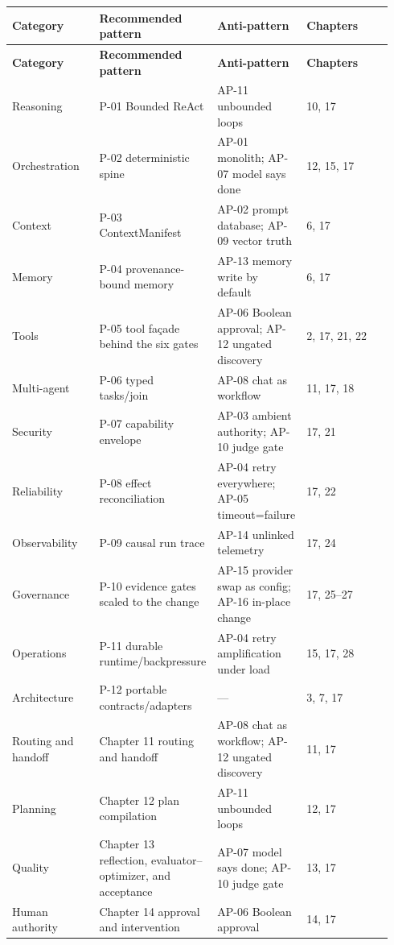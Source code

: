 \BookTableStart
\fontsize{7.2}{9}\selectfont
\begin{longtable}{@{}Y{0.2350\linewidth}Y{0.2350\linewidth}Y{0.2350\linewidth}Y{0.2350\linewidth}@{}}
\color{white}\bfseries \textbf{Category} & \color{white}\bfseries \textbf{Recommended pattern} & \color{white}\bfseries \textbf{Anti-pattern} & \color{white}\bfseries \textbf{Chapters} \\
\endfirsthead
{}
\color{white}\bfseries \textbf{Category} & \color{white}\bfseries \textbf{Recommended pattern} & \color{white}\bfseries \textbf{Anti-pattern} & \color{white}\bfseries \textbf{Chapters} \\
\endhead
Reasoning & P-01 Bounded ReAct & AP-11 unbounded loops & 10, 17 \\
Orchestration & P-02 deterministic spine & AP-01 monolith; AP-07 model says done & 12, 15, 17 \\
Context & P-03 ContextManifest & AP-02 prompt database; AP-09 vector truth & 6, 17 \\
Memory & P-04 provenance-bound memory & AP-13 memory write by default & 6, 17 \\
Tools & P-05 tool façade behind the six gates & AP-06 Boolean approval; AP-12 ungated discovery & 2, 17, 21, 22 \\
Multi-agent & P-06 typed tasks/join & AP-08 chat as workflow & 11, 17, 18 \\
Security & P-07 capability envelope & AP-03 ambient authority; AP-10 judge gate & 17, 21 \\
Reliability & P-08 effect reconciliation & AP-04 retry everywhere; AP-05 timeout=failure & 17, 22 \\
Observability & P-09 causal run trace & AP-14 unlinked telemetry & 17, 24 \\
Governance & P-10 evidence gates scaled to the change & AP-15 provider swap as config; AP-16 in-place change & 17, 25–27 \\
Operations & P-11 durable runtime/backpressure & AP-04 retry amplification under load & 15, 17, 28 \\
Architecture & P-12 portable contracts/adapters & — & 3, 7, 17 \\
Routing and handoff & Chapter 11 routing and handoff & AP-08 chat as workflow; AP-12 ungated discovery & 11, 17 \\
Planning & Chapter 12 plan compilation & AP-11 unbounded loops & 12, 17 \\
Quality & Chapter 13 reflection, evaluator–optimizer, and acceptance & AP-07 model says done; AP-10 judge gate & 13, 17 \\
Human authority & Chapter 14 approval and intervention & AP-06 Boolean approval & 14, 17 \\
\end{longtable}
\BookTableEnd

